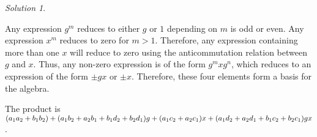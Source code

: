 \documentclass{article}
\theoremstyle{definition}
\theoremstyle{remark}
\newtheorem*{Solution*}{Solution}
\theoremstyle{underline}
\theoremstyle{underline}
\begin{document}
	\begin{Solution*}
		\begin{subquests}
			\item Any expression $g^m$ reduces to either $g$ or $1$ depending on $m$ is odd or even. Any expression $x^m$ reduces to zero for $m > 1$. Therefore, any expression containing more than one $x$ will reduce to zero using the anticommutation relation between $g$ and $x$. Thus, any non-zero expression is of the form $g^m x g^n$, which reduces to an expression of the form $\pm gx$ or $\pm x$. Therefore, these four elements form a basis for the algebra.

			\item The product is $\pqty{a_1 a_2 + b_1 b_2} + \pqty{a_1 b_2 + a_2 b_1 + b_1 d_2 + b_2 d_1}g + \pqty{a_1 c_2 + a_2 c_1}x + \pqty{a_1 d_2 + a_2 d_1 + b_1 c_2 + b_2 c_1}gx $.


\end{subquests}
\end{Solution*}
\end{document}
